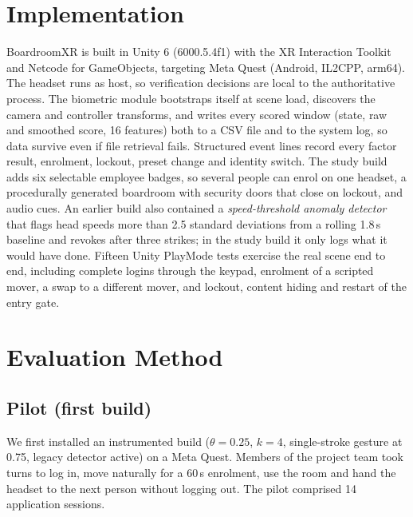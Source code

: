 \section{Implementation}
\label{sec:impl}
BoardroomXR is built in Unity 6 (6000.5.4f1) with the XR Interaction Toolkit and Netcode for GameObjects, targeting Meta Quest (Android, IL2CPP, arm64). The headset runs as host, so verification decisions are local to the authoritative process. The biometric module bootstraps itself at scene load, discovers the camera and controller transforms, and writes every scored window (state, raw and smoothed score, 16 features) both to a CSV file and to the system log, so data survive even if file retrieval fails. Structured event lines record every factor result, enrolment, lockout, preset change and identity switch. The study build adds six selectable employee badges, so several people can enrol on one headset, a procedurally generated boardroom with security doors that close on lockout, and audio cues. An earlier build also contained a \emph{speed-threshold anomaly detector} that flags head speeds more than 2.5 standard deviations from a rolling 1.8\,s baseline and revokes after three strikes; in the study build it only logs what it would have done. Fifteen Unity PlayMode tests exercise the real scene end to end, including complete logins through the keypad, enrolment of a scripted mover, a swap to a different mover, and lockout, content hiding and restart of the entry gate.

\section{Evaluation Method}
\label{sec:method}
\subsection{Pilot (first build)}
We first installed an instrumented build ($\theta{=}0.25$, $k{=}4$, single-stroke gesture at 0.75, legacy detector active) on a Meta Quest. Members of the project team took turns to log in, move naturally for a 60\,s enrolment, use the room and hand the headset to the next person without logging out. The pilot comprised 14 application sessions.

